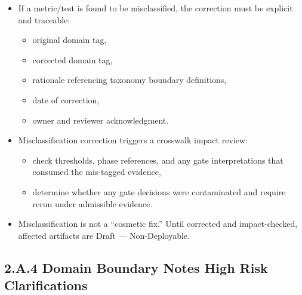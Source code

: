 \documentclass[10pt]{article}
\begin{document}
\begin{itemize}
\item If a metric/test is found to be misclassified, the correction must be explicit and traceable:
  \begin{itemize}
  \item original domain tag,
  \item corrected domain tag,
  \item rationale referencing taxonomy boundary definitions,
  \item date of correction,
  \item owner and reviewer acknowledgment.
  \end{itemize}
\item Misclassification correction triggers a crosswalk impact review:
  \begin{itemize}
  \item check thresholds, phase references, and any gate interpretations that consumed the mis-tagged evidence,
  \item determine whether any gate decisions were contaminated and require rerun under admissible evidence.
  \end{itemize}
\item Misclassification is not a “cosmetic fix.” Until corrected and impact-checked, affected artifacts are Draft — Non-Deployable.
\end{itemize}

\subsection*{2.A.4 Domain Boundary Notes High Risk Clarifications}
{}
\end{document}
